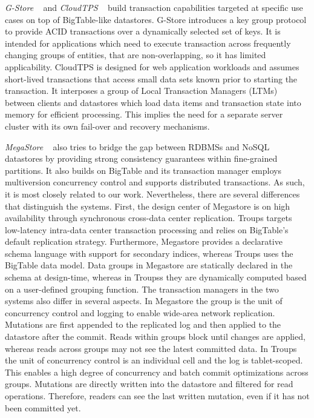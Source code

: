 \documentclass[10pt,final,journal]{IEEEtran}
\begin{document}
\emph{G-Store} ~\cite{Das:2010:GSD:1807128.1807157} and \emph{CloudTPS} ~\cite{Wei:2011:5740834} build transaction capabilities targeted at specific use cases on top of BigTable-like datastores. G-Store introduces a key group protocol to provide ACID transactions over a dynamically selected set of keys. It is intended for applications which need to execute transaction across frequently changing groups of entities, that are non-overlapping, so it has limited applicability. CloudTPS is designed for web application workloads and assumes short-lived transactions that access small data sets known prior to starting the transaction. It interposes a group of Local Transaction Managers (LTMs) between clients and datastores which load data items and transaction state into memory for efficient processing. This implies the need for a separate server cluster with its own fail-over and recovery mechanisms.

\emph{MegaStore} ~\cite{Furman:2008:8530095, Baker:2011:8530095} also tries to bridge the gap between RDBMSs and NoSQL datastores by providing strong consistency guarantees within fine-grained partitions. It also builds on BigTable and its transaction manager employs multiversion concurrency control and supports distributed transactions. As such, it is most closely related to our work. Nevertheless, there are several differences that distinguish the systems. First, the design center of Megastore is on high availability through synchronous cross-data center replication. Troups targets low-latency intra-data center transaction processing and relies on BigTable's default replication strategy. Furthermore, Megastore provides a declarative schema language with support for secondary indices, whereas Troups uses the BigTable data model. Data groups in Megastore are statically declared in the schema at design-time, whereas in Troupss they are dynamically computed based on a user-defined grouping function. The transaction managers in the two systems also differ in several aspects. In Megastore the group is the unit of concurrency control and logging to enable wide-area network replication. Mutations are first appended to the replicated log and then applied to the datastore after the commit. Reads within groups block until changes are applied, whereas reads across groups may not see the latest committed data. In Troups the unit of concurrency control is an individual cell and the log is tablet-scoped. This enables a high degree of concurrency and batch commit optimizations across groups. Mutations are directly written into the datastore and filtered for read operations. Therefore, readers can see the last written mutation, even if it has not been committed yet.
\end{document}
